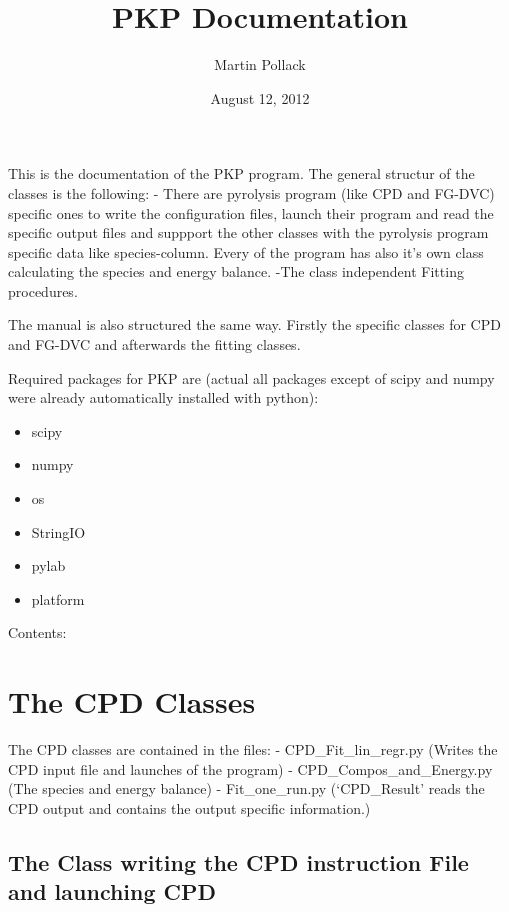 \documentclass[letterpaper,10pt,english]{sphinxmanual}
\title{PKP Documentation}
\date{August 12, 2012}
\author{Martin Pollack}
\begin{document}
\maketitle
\tableofcontents
{}\label{index::doc}


This is the documentation of the PKP program. The general structur of the classes is the following:
- There are pyrolysis program (like CPD and FG-DVC) specific ones to write the configuration files, launch their program and read the specific output files and suppport the other classes with the pyrolysis program specific data like species-column. Every of the program has also it's own class calculating the species and energy balance.
-The class independent Fitting procedures.

The manual is also structured the same way. Firstly the specific classes for CPD and FG-DVC and afterwards the fitting classes.

Required packages for PKP are (actual all packages except of scipy and numpy were already automatically installed with python):
\begin{itemize}
\item {} 
scipy

\item {} 
numpy

\item {} 
os

\item {} 
StringIO

\item {} 
pylab

\item {} 
platform

\end{itemize}

Contents:


\chapter{The CPD Classes}
\label{CPDClasses::doc}\label{CPDClasses:the-pkp-code-documentation}\label{CPDClasses:the-cpd-classes}
The CPD classes are contained in the files:
- CPD\_Fit\_lin\_regr.py  (Writes the CPD input file and launches of the program)
- CPD\_Compos\_and\_Energy.py  (The species and energy balance)
- Fit\_one\_run.py  (`CPD\_Result' reads the CPD output and contains the output specific information.)
\label{CPDClasses:ss-readgen}

\section{The Class writing the CPD instruction File and launching CPD}
\label{CPDClasses:ss-readgen}\label{CPDClasses:the-class-writing-the-cpd-instruction-file-and-launching-cpd}\label{CPDClasses:my-reference-label}
\end{document}
